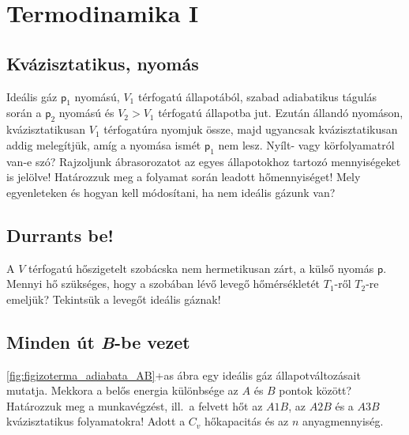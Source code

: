 \documentclass[12pt,a4paper]{scrartcl}
\newcommand{\pres}{\mathsf p}	%
\begin{document}
\section{Termodinamika I}
\subsection{Kvázisztatikus, nyomás}
Ideális gáz $\pres_1$ nyomású, $V_1$ térfogatú állapotából, szabad adiabatikus tágulás során a $\pres_2$ nyomású és $V_2 > V_1$  térfogatú állapotba jut. Ezután állandó nyomáson, kvázisztatikusan $V_1$  térfogatúra nyomjuk össze, majd ugyancsak kvázisztatikusan addig melegítjük, amíg a nyomása ismét $\pres_1$ nem lesz. Nyílt- vagy körfolyamatról van-e szó? Rajzoljunk ábrasorozatot az egyes állapotokhoz tartozó mennyiségeket is jelölve! Határozzuk meg a folyamat során leadott hőmennyiséget! Mely egyenleteken és hogyan kell módosítani, ha nem ideális gázunk van?
\subsection{Durrants be!}
A $V$ térfogatú hőszigetelt szobácska nem hermetikusan zárt, a külső nyomás $\pres$. Mennyi hő szükséges, hogy a szobában lévő levegő hőmérsékletét $T_1$-ről $T_2$-re emeljük? Tekintsük a levegőt ideális gáznak!
\subsection{Minden út \textit{B}-be vezet}
\Atold\ref{fig:figizoterma_adiabata_AB}+as{} ábra egy ideális gáz állapotváltozásait mutatja. Mekkora a belős energia különbsége az $A$ és $B$ pontok között? Határozzuk meg a munkavégzést, ill.\ a felvett hőt az $A1B$, az $A2B$ és a $A3B$ kvázisztatikus folyamatokra! Adott a $C_v$ hőkapacitás és az $n$ anyagmennyiség.
\end{document}
